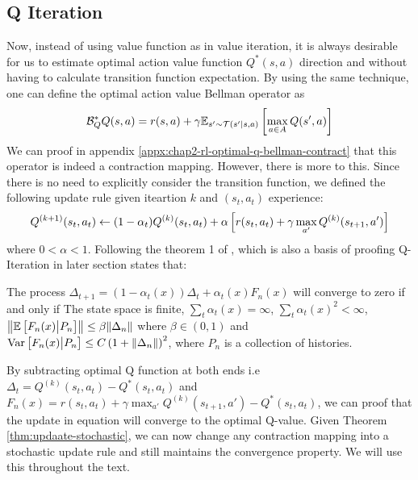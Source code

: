 \subsection{Q Iteration}
\label{sec:chap2-Q-iter}
Now, instead of using value function as in value iteration, it is always desirable for us to estimate optimal action value function $Q^*(s, a)$ direction and without having to calculate transition function expectation. By using the same technique, one can define the optimal action value Bellman operator as 
\begin{equation}
    \mathcal{B}^*_Q Q(s, a) = r(s, a) + \gamma \mathbb{E}_{s' \sim \mathcal{T}(s' | s, a)}\left[ \max_{a\in A} Q(s', a) \right] 
\end{equation}
We can proof in appendix \ref{appx:chap2-rl-optimal-q-bellman-contract} that this operator is indeed a contraction mapping. However, there is more to this. Since there is no need to explicitly consider the transition function, we defined the following update rule given iteartion $k$ and $(s_t, a_t)$ experience:
\begin{equation}
\label{eqn:chap2-Q-stochastic-update}
    Q^{(k+1)}(s_t, a_t) \leftarrow (1-\alpha_t) Q^{(k)}(s_t, a_t) + \alpha\left[ r(s_t, a_t) + \gamma \max_{a'} Q^{(k)}(s_{t+1}, a') \right]
\end{equation}
where $0 < \alpha < 1$. Following the theorem 1 of \cite{jaakkola1994convergence}, which is also a basis of proofing Q-Iteration in later section states that:
\begin{theorem}
\label{thm:updaate-stochastic}{\cite{jaakkola1994convergence}}
    The process $\Delta_{t+1} = (1-\alpha_t(x)) \Delta_t + \alpha_t(x) F_n(x) $ will converge to zero if and only if The state space is finite, $\sum_t \alpha_t(x) = \infty$, $\sum_t \alpha_t(x)^2 < \infty$, $\left\|\mathbb{E}\left[ F_n(x) \big| P_n \right] \right\| \le \beta \|\Delta_n\|$ where $\beta \in (0, 1)$ and  $\operatorname{Var}\left[ F_n(x) \big| P_n \right] \le C\left( 1 + \|\Delta_n\| \right)^2$, where $P_n$ is a collection of histories. 
\end{theorem}
By subtracting optimal Q function at both ends i.e $\Delta_t = Q^{(k)}(s_t, a_t) - Q^*(s_t, a_t)$ and $F_n(x) = r(s_t, a_t) + \gamma \max_{a'} Q^{(k)}(s_{t+1}, a') - Q^*(s_t, a_t)$, we can proof that the update in equation \label{eqn:chap2-Q-stochastic-update} will converge to the optimal Q-value. Given Theorem \ref{thm:updaate-stochastic}, we can now change any contraction mapping into a stochastic update rule and still maintains the convergence property. We will use this throughout the text.